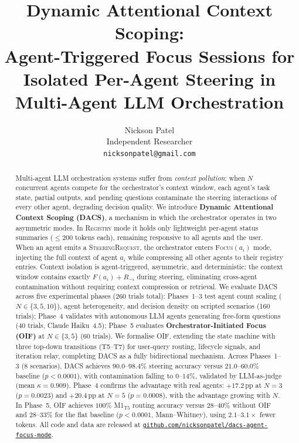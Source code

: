 \documentclass{article}
\title{Dynamic Attentional Context Scoping:\\
Agent-Triggered Focus Sessions for\\
Isolated Per-Agent Steering in Multi-Agent LLM Orchestration}
\author{%
  Nickson Patel \\
  Independent Researcher \\
  \texttt{nicksonpatel@gmail.com}
}
\begin{document}
\maketitle
\renewcommand{\arraystretch}{1.15}

\begin{abstract}
Multi-agent LLM orchestration systems suffer from \emph{context pollution}:
when $N$ concurrent agents compete for the orchestrator's context window,
each agent's task state, partial outputs, and pending questions contaminate
the steering interactions of every other agent, degrading decision quality.
We introduce \textbf{Dynamic Attentional Context Scoping (DACS)}, a
mechanism in which the orchestrator operates in two asymmetric modes.
In \textsc{Registry} mode it holds only lightweight per-agent status
summaries ($\leq 200$ tokens each), remaining responsive to all agents
and the user.
When an agent emits a \textsc{SteeringRequest}, the orchestrator enters
\textsc{Focus}$(a_i)$ mode, injecting the full context of agent $a_i$
while compressing all other agents to their registry entries.
Context isolation is agent-triggered, asymmetric, and deterministic:
the context window contains exactly $F(a_i) + R_{-i}$ during steering,
eliminating cross-agent contamination without requiring context
compression or retrieval.
We evaluate DACS across five experimental phases (260 trials total):
Phases~1--3 test agent count scaling ($N{\in}\{3,5,10\}$), agent
heterogeneity, and decision density on scripted scenarios (160 trials);
Phase~4 validates with autonomous LLM agents generating free-form
questions (40 trials, Claude Haiku~4.5);
Phase~5 evaluates \textbf{Orchestrator-Initiated Focus (OIF)} at
$N{\in}\{3,5\}$ (60 trials).
We formalise OIF, extending the state machine with three top-down
transitions (T5--T7) for user-query routing, lifecycle signals, and
iteration relay, completing DACS as a fully bidirectional mechanism.
Across Phases~1--3 (8 scenarios), DACS achieves $90.0$--$98.4\%$
steering accuracy versus $21.0$--$60.0\%$ baseline ($p < 0.0001$),
with contamination falling to $0$--$14\%$, validated by LLM-as-judge
(mean $\kappa=0.909$).
Phase~4 confirms the advantage with real agents:
$+17.2$\,pp at $N{=}3$ ($p{=}0.0023$) and $+20.4$\,pp at $N{=}5$
($p{=}0.0008$), with the advantage growing with $N$.
In Phase~5, OIF achieves $100\%$ M1$_{\mathrm{T5}}$ routing accuracy
versus $28$--$40\%$ without OIF and $28$--$33\%$ for the flat baseline
($p < 0.0001$, Mann--Whitney), using $2.1$--$3.1\times$ fewer tokens.
All code and data are released at
\href{https://github.com/nicksonpatel/dacs-agent-focus-mode}{\texttt{github.com/nicksonpatel/dacs-agent-focus-mode}}.
\end{abstract}
\end{document}
